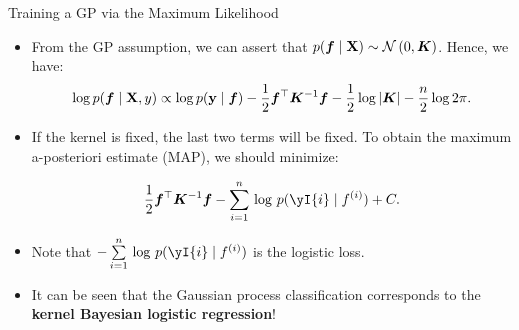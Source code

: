 \begin{frame}[c,allowframebreaks]{Training a GP via the Maximum Likelihood}
\begin{itemize}
\vspace{15mm}

\item From the GP assumption, we can assert that $p(\bm{f}\mid\mathbf{X}) \sim \mathcal{N}\left(0, \bm{K}\right)$. Hence, we have:
\vspace{-2mm}
$$\log p(\bm{f}\mid\mathbf{X}, y) \propto \log p(\mathbf{y}\mid\bm{f}) - \frac{1}{2} \bm{f}^\top \bm{K}^{-1} \bm{f} - \frac{1}{2} \log |\bm{K}| - \frac{n}{2} \log 2 \pi.$$

\end{itemize}


\framebreak

\begin{itemize}

\item If the kernel is fixed, the last two terms will be fixed. To obtain the maximum a-posteriori estimate (MAP), we should minimize:

$$\frac{1}{2} \bm{f}^\top \bm{K}^{-1}\bm{f} - \sumin\, \log\, p(\yI{i}\mid f^{(i)}) + C.$$

\vspace{0.5cm}
\item Note that $-\sumin\,\log \,p(\yI{i}\mid f^{(i)})$ is the logistic loss.

\vspace{0.7cm}
\item It can be seen that the Gaussian process classification corresponds to the \textbf{kernel Bayesian logistic regression}!
\end{itemize}

\end{frame}




